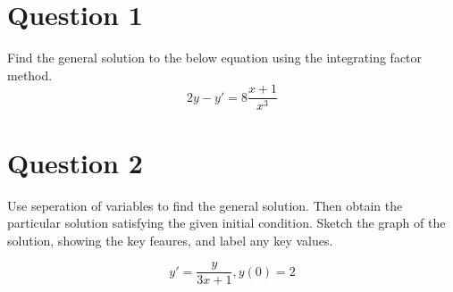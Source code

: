 \documentclass{article}
\begin{document}
\section*{Question 1}

Find the general solution to the below equation using the integrating factor
method.
$$2y - y' = 8 \frac{x+1}{x^3}$$

\section*{Question 2}

Use seperation of variables to find the general solution. Then
obtain the particular solution satisfying the given initial condition.
Sketch the graph of the solution, showing the key feaures, and label any
key values.

$$y' = \frac{y}{3x+1}, y(0) = 2$$
\end{document}
